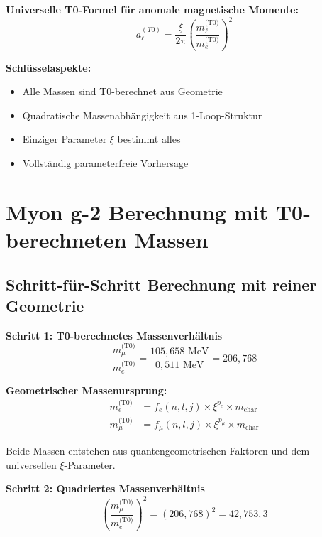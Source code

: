 \documentclass[12pt,a4paper]{article}
\numberwithin{equation}{section}
\begin{document}
	\begin{t0formel}
		\textbf{Universelle T0-Formel f\"ur anomale magnetische Momente:}
		\begin{equation}
			\boxed{a_\ell^{(T0)} = \frac{\xi}{2\pi} \left(\frac{m_\ell^{\text{(T0)}}}{m_e^{\text{(T0)}}}\right)^2}
		\end{equation}
		
		\textbf{Schl\"usselaspekte:}
		\begin{itemize}
			\item Alle Massen sind T0-berechnet aus Geometrie
			\item Quadratische Massenabh\"angigkeit aus 1-Loop-Struktur
			\item Einziger Parameter $\xi$ bestimmt alles
			\item Vollst\"andig parameterfreie Vorhersage
		\end{itemize}
	\end{t0formel}
	
	\section{Myon g-2 Berechnung mit T0-berechneten Massen}
	
	\subsection{Schritt-f\"ur-Schritt Berechnung mit reiner Geometrie}
	
	\textbf{Schritt 1: T0-berechnetes Massenverh\"altnis}
	\begin{equation}
		\frac{m_\mu^{\text{(T0)}}}{m_e^{\text{(T0)}}} = \frac{105{,}658 \text{ MeV}}{0{,}511 \text{ MeV}} = 206{,}768
	\end{equation}
	
	\begin{t0berechnung}
		\textbf{Geometrischer Massenursprung:}
		\begin{align}
			m_e^{\text{(T0)}} &= f_e(n,l,j) \times \xi^{p_e} \times m_{\text{char}}\\
			m_\mu^{\text{(T0)}} &= f_\mu(n,l,j) \times \xi^{p_\mu} \times m_{\text{char}}
		\end{align}
		
		Beide Massen entstehen aus quantengeometrischen Faktoren und dem universellen $\xi$-Parameter.
	\end{t0berechnung}
	
	\textbf{Schritt 2: Quadriertes Massenverh\"altnis}
	\begin{equation}
		\left(\frac{m_\mu^{\text{(T0)}}}{m_e^{\text{(T0)}}}\right)^2 = (206{,}768)^2 = 42{,}753{,}3
	\end{equation}
	
\end{document}
